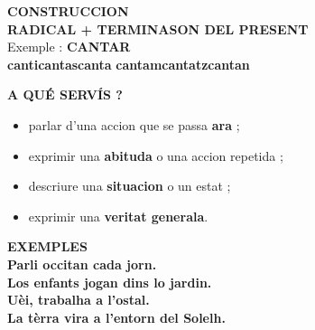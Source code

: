 \documentclass[a4paper,11pt]{article}
\begin{document}
\vspace{2.5mm}\hspace*{6mm}
\begin{minipage}{0.91\textwidth}

\begin{greenbox}
\textbf{\color{GreenDark}CONSTRUCCION}\\[1mm]
\centering
{\Large \textbf{RADICAL + TERMINASON DEL PRESENT}}\\[1mm]
\small
Exemple : \textbf{CANTAR}\\[1mm]
\textbf{canti}\quad \textbf{cantas}\quad \textbf{canta}\quad
\textbf{cantam}\quad \textbf{cantatz}\quad \textbf{cantan}
\end{greenbox}

\vspace{2.5mm}
\begin{center}
\end{center}

\vspace{1.5mm}
\begin{greenbox}
\textbf{\color{GreenDark}A QUÉ SERVÍS ?}\\[1mm]
\begin{itemize}\setlength{\itemsep}{0.4mm}
\item parlar d'una accion que se passa \textbf{ara} ;
\item exprimir una \textbf{abituda} o una accion repetida ;
\item descriure una \textbf{situacion} o un estat ;
\item exprimir una \textbf{veritat generala}.
\end{itemize}
\end{greenbox}

\vspace{2mm}
\begin{greenbox}
\textbf{\color{GreenDark}EXEMPLES}\\[1mm]
\textbf{Parli occitan cada jorn.}\\
\textbf{Los enfants jogan dins lo jardin.}\\
\textbf{Uèi, trabalha a l'ostal.}\\
\textbf{La tèrra vira a l'entorn del Solelh.}
\end{greenbox}


\end{minipage}
\end{document}
